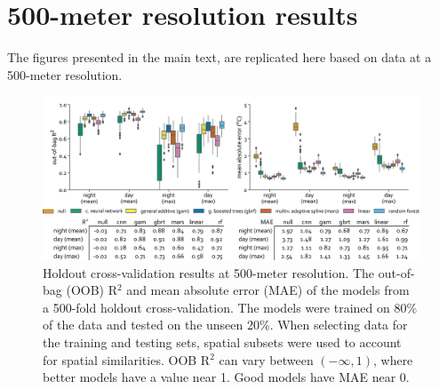 \documentclass[final,3p,times,onecolumn,sort&compress]{elsarticle}
\begin{document}
\clearpage
\section{500-meter resolution results}
\label{ss:500_meter}
The figures presented in the main text, are replicated here based on data at a 500-meter resolution.

\begin{figure}[h]
    \centering
    \includegraphics[width=\linewidth]{fig/report/holdout_500.png}
    \caption[Holdout cross-validation results at 500-meter resolution]{
    Holdout cross-validation results at 500-meter resolution. 
    The out-of-bag (OOB) R$^2$ and mean absolute error (MAE) of the models from a 500-fold holdout cross-validation. 
    The models were trained on 80\% of the data and tested on the unseen 20\%.
    When selecting data for the training and testing sets, spatial subsets were used to account for spatial similarities. 
    OOB R$^2$ can vary between $(-\infty, 1)$, where better models have a value near 1. 
    Good models have MAE near 0.
    }
    \label{fig:holdout_500}
\end{figure}
\end{document}
